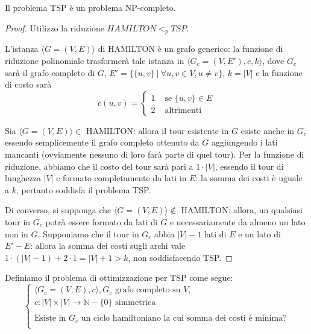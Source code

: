 \begin{teorema}
Il problema TSP è un problema NP-completo.
\end{teorema}
\begin{proof}
Utilizzo la riduzione $ HAMILTON <_p TSP$.

L'istanza $\langle G=(V,E)\rangle $ di HAMILTON è un grafo generico: la funzione di riduzione polinomiale trasformerà tale istanza in $\langle G_c=(V,E'),c,k\rangle $, dove $G_c$ sarà il grafo completo di $G$, $E'=\{\{u,v\}\ |\ \forall u,v \in V, u \neq v\}$, $k=|V|$ e la funzione di costo sarà
\[
c(u,v)=
\begin{cases}
1 &\mbox{ se } \{u,v\} \in E \\
2 &\mbox{ altrimenti}
\end{cases}
\]

Sia $\langle G=(V,E)\rangle \in$ HAMILTON: allora il tour esistente in $G$ esiste anche in $G_c$ essendo semplicemente il grafo completo ottenuto da $G$ aggiungendo i lati mancanti (ovviamente nessuno di loro farà parte di quel tour). Per la funzione di riduzione, abbiamo che il costo del tour sarà pari a $1\cdot|V|$, essendo il tour di lunghezza $|V|$ e formato completamente da lati in $E$: la somma dei costi è uguale a $k$, pertanto soddisfa il problema TSP.

Di converso, si supponga che $\langle G=(V,E)\rangle\notin$ HAMILTON: allora, un qualsiasi tour in $G_c$ potrà essere formato da lati di $G$ e necessariamente da almeno un lato non in $G$. Supponiamo che il tour in $G_c$ abbia $|V|-1$ lati di $E$ e un lato di $E'-E$: allora la somma dei costi sugli archi vale $1\cdot(|V|-1) + 2\cdot1=|V|+1 > k$, non soddisfacendo TSP.
\end{proof}

Definiamo il problema di ottimizzazione per TSP come segue:
\[
\begin{cases}
\langle G_c=(V,E),c\rangle ,G_c \mbox{ grafo completo su $V$,} \\
c : |V| \times |V| \rightarrow \mathbb{N}-\{0\} \mbox{ simmetrica}\\
\\
\mbox{Esiste in $G_c$ un ciclo hamiltoniano la cui somma dei costi è minima?} \\
\end{cases}
\]

